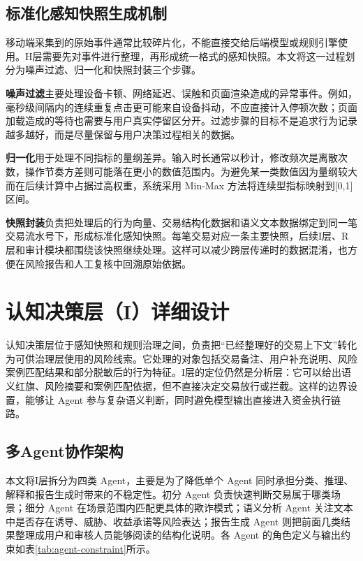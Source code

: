 \documentclass{xduugthesis}
\begin{document}
\subsection{标准化感知快照生成机制}

移动端采集到的原始事件通常比较碎片化，不能直接交给后端模型或规则引擎使用。H层需要先对事件进行整理，再形成统一格式的感知快照。本文将这一过程划分为噪声过滤、归一化和快照封装三个步骤。

\textbf{噪声过滤}主要处理设备卡顿、网络延迟、误触和页面渲染造成的异常事件。例如，毫秒级间隔内的连续重复点击更可能来自设备抖动，不应直接计入停顿次数；页面加载造成的等待也需要与用户真实停留区分开。过滤步骤的目标不是追求行为记录越多越好，而是尽量保留与用户决策过程相关的数据。

\textbf{归一化}用于处理不同指标的量纲差异。输入时长通常以秒计，修改频次是离散次数，操作节奏方差则可能落在更小的数值范围内。为避免某一类数值因为量纲较大而在后续计算中占据过高权重，系统采用 Min-Max 方法将连续型指标映射到[0,1]区间。

\textbf{快照封装}负责把处理后的行为向量、交易结构化数据和语义文本数据绑定到同一笔交易流水号下，形成标准化感知快照。每笔交易对应一条主要快照，后续I层、R层和审计模块都围绕该快照继续处理。这样可以减少跨层传递时的数据混淆，也方便在风险报告和人工复核中回溯原始依据。

\section{认知决策层（I）详细设计}

认知决策层位于感知快照和规则治理之间，负责把“已经整理好的交易上下文”转化为可供治理层使用的风险线索。它处理的对象包括交易备注、用户补充说明、风险案例匹配结果和部分脱敏后的行为特征。I层的定位仍然是分析层：它可以给出语义红旗、风险摘要和案例匹配依据，但不直接决定交易放行或拦截。这样的边界设置，能够让 Agent 参与复杂语义判断，同时避免模型输出直接进入资金执行链路。

\subsection{多Agent协作架构}

本文将I层拆分为四类 Agent，主要是为了降低单个 Agent 同时承担分类、推理、解释和报告生成时带来的不稳定性。初分 Agent 负责快速判断交易属于哪类场景；细分 Agent 在场景范围内匹配更具体的欺诈模式；语义分析 Agent 关注文本中是否存在诱导、威胁、收益承诺等风险表达；报告生成 Agent 则把前面几类结果整理成用户和审核人员能够阅读的结构化说明。各 Agent 的角色定义与输出约束如表\ref{tab:agent-constraint}所示。
\end{document}
